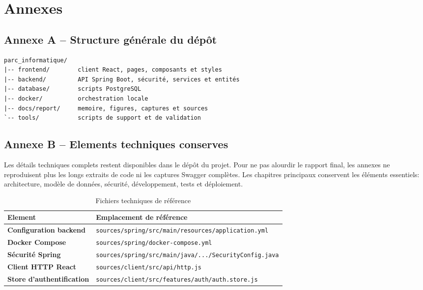 ﻿\documentclass[12pt,a4paper,oneside]{report}
\begin{document}
\appendix

\chapter{Annexes}

\section{Annexe A -- Structure générale du dépôt}
\begin{keybox}
\begin{verbatim}
parc_informatique/
|-- frontend/        client React, pages, composants et styles
|-- backend/         API Spring Boot, sécurité, services et entités
|-- database/        scripts PostgreSQL
|-- docker/          orchestration locale
|-- docs/report/     memoire, figures, captures et sources
`-- tools/           scripts de support et de validation
\end{verbatim}
\end{keybox}

\section{Annexe B -- Elements techniques conserves}
Les détails techniques complets restent disponibles dans le dépôt du projet. Pour ne pas alourdir le rapport final, les annexes ne reproduisent plus les longs extraits de code ni les captures Swagger complètes. Les chapitres principaux conservent les éléments essentiels: architecture, modèle de données, sécurité, développement, tests et déploiement.

\begin{table}[H]
\centering
\caption{Fichiers techniques de référence}
\begin{tabularx}{\textwidth}{>{\bfseries}p{4cm}X}
\toprule
Element & Emplacement de référence \\
\midrule
Configuration backend & \texttt{sources/spring/src/main/resources/application.yml} \\
Docker Compose & \texttt{sources/spring/docker-compose.yml} \\
Sécurité Spring & \texttt{sources/spring/src/main/java/.../SecurityConfig.java} \\
Client HTTP React & \texttt{sources/client/src/api/http.js} \\
Store d'authentification & \texttt{sources/client/src/features/auth/auth.store.js} \\
\bottomrule
\end{tabularx}
\end{table}
\end{document}
